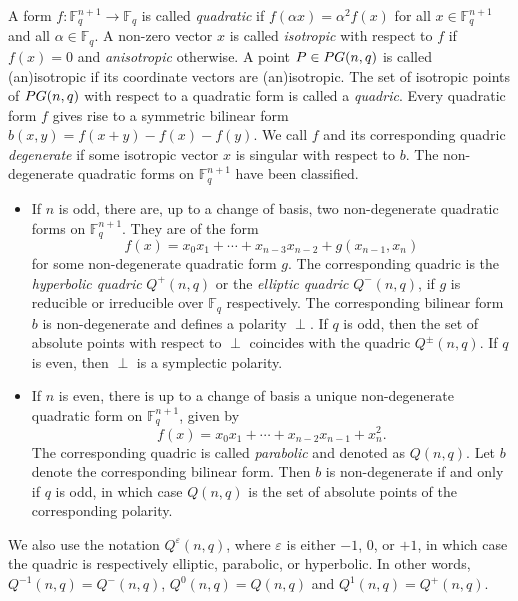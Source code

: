 \documentclass[a4paper]{article}
\theoremstyle{definition}
\newcommand{\eps}{\varepsilon}
\newcommand{\FF}{\mathbb F}
\newcommand{\pg}{\textnormal{PG}}
\newcommand{\mq}{%
 Q}
\begin{document}
A form $f: \FF_q^{n+1} \to \FF_q$ is called \emph{quadratic} if $f(\alpha x) = \alpha^2 f(x)$ for all $x \in \FF_q^{n+1}$ and all $\alpha \in \FF_q$.
A non-zero vector $x$ is called \emph{isotropic} with respect to $f$ if $f(x)=0$ and \emph{anisotropic} otherwise.
A point $P \in \pg(n,q)$ is called (an)isotropic if its coordinate vectors are (an)isotropic.
The set of isotropic points of $\pg(n,q)$ with respect to a quadratic form is called a \emph{quadric}.
Every quadratic form $f$ gives rise to a symmetric bilinear form $b(x,y) = f(x+y) - f(x) - f(y)$.
We call $f$ and its corresponding quadric \emph{degenerate} if some isotropic vector $x$ is singular with respect to $b$.
The non-degenerate quadratic forms on $\FF_q^{n+1}$ have been classified.
\begin{itemize}
 \item If $n$ is odd, there are, up to a change of basis, two non-degenerate quadratic forms on $\FF_q^{n+1}$.
 They are of the form
 \[
  f(x) = x_0 x_1 + \cdots + x_{n-3} x_{n-2} + g(x_{n-1},x_n)
 \]
 for some non-degenerate quadratic form $g$.
 The corresponding quadric is the \emph{hyperbolic quadric} $Q^+(n,q)$ or the \emph{elliptic quadric} $Q^-(n,q)$, if $g$ is reducible or irreducible over $\FF_q$ respectively.
 The corresponding bilinear form $b$ is non-degenerate and defines a polarity $\perp$.
 If $q$ is odd, then the set of absolute points with respect to $\perp$ coincides with the quadric $\mq^\pm(n,q)$.
 If $q$ is even, then $\perp$ is a symplectic polarity.
 \item If $n$ is even, there is up to a change of basis a unique non-degenerate quadratic form on $\FF_q^{n+1}$, given by
 \[
  f(x) = x_0 x_1 + \cdots + x_{n-2} x_{n-1} + x_n^2.
 \]
 The corresponding quadric is called \emph{parabolic} and denoted as $\mq(n,q)$.
 Let $b$ denote the corresponding bilinear form.
 Then $b$ is non-degenerate if and only if $q$ is odd, in which case $\mq(n,q)$ is the set of absolute points of the corresponding polarity.
\end{itemize}
We also use the notation $Q^\eps(n,q)$, where $\eps$ is either $-1$, $0$, or $+1$, in which case the quadric is respectively elliptic, parabolic, or hyperbolic. In other words, $Q^{-1}(n,q)=Q^-(n,q)$, $Q^0(n,q)=Q(n,q)$ and $Q^1(n,q)=Q^+(n,q)$.
\end{document}
